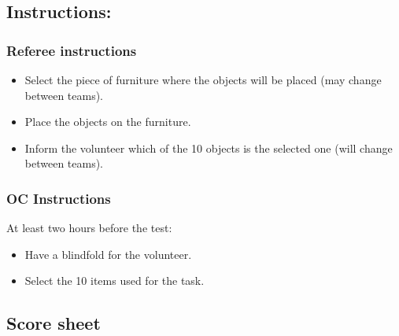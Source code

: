\subsection*{Instructions:}
\subsubsection*{Referee instructions}

\begin{itemize}
	\item Select the piece of furniture where the objects will be placed (may change between teams).
	\item Place the objects on the furniture.
	\item Inform the volunteer which of the 10 objects is the selected one (will change between teams).
\end{itemize}

\subsubsection*{OC Instructions}
At least two hours before the test:
\begin{itemize}
	\item Have a blindfold for the volunteer.
	\item Select the 10 items used for the task.
\end{itemize}

\subsection*{Score sheet}



